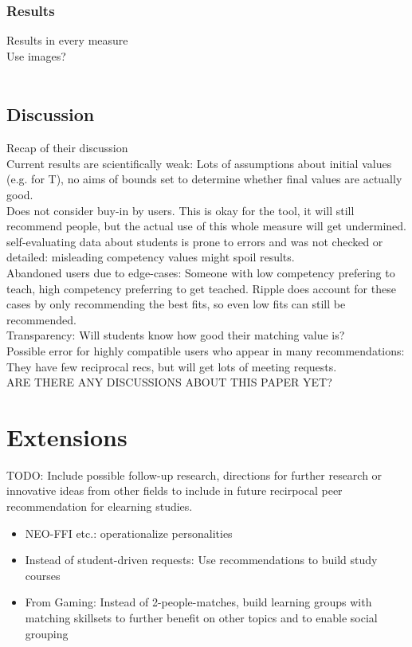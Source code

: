 \documentclass[nochapterpage,bigchapter,linedtoc,longdoc,colorback,accentcolor=tud3b]{tudreport}
\begin{document}
\subsection{Results}
Results in every measure\\
Use images?\\\

\section{Discussion}
Recap of their discussion\\
Current results are scientifically weak: Lots of assumptions about initial values (e.g. for T), no aims of bounds set to determine whether final values are actually good.\\
Does not consider buy-in by users. This is okay for the tool, it will still recommend people, but the actual use of this whole measure will get undermined.\\
self-evaluating data about students is prone to errors and was not checked or detailed: misleading competency values might spoil results.\\
Abandoned users due to edge-cases: Someone with low competency prefering to teach, high competency preferring to get teached. Ripple does account for these cases by only recommending the best fits, so even low fits can still be recommended.\\
Transparency: Will students know how good their matching value is?\\
Possible error for highly compatible users who appear in many recommendations: They have few reciprocal recs, but will get lots of meeting requests.\\
ARE THERE ANY DISCUSSIONS ABOUT THIS PAPER YET?\\


\chapter{Extensions}
TODO: Include possible follow-up research, directions for further research or innovative ideas from other fields to include in future recirpocal peer recommendation for elearning studies.\\
\begin{itemize}
	\item NEO-FFI etc.: operationalize personalities
	\item Instead of student-driven requests: Use recommendations to build study courses
	\item From Gaming: Instead of 2-people-matches, build learning groups with matching skillsets to further benefit on other topics and to enable social grouping\\
\end{itemize}




\end{document}
